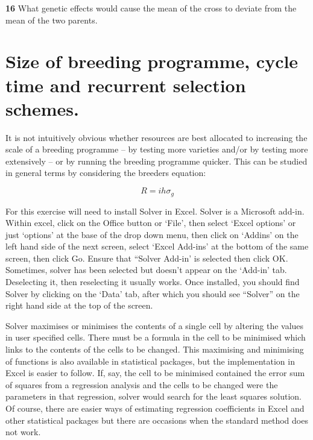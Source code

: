 \documentclass[
]{book}
\makeatletter
\newenvironment{kframe}{%
\medskip{}
\setlength{\fboxsep}{.8em}
 \def\at@end@of@kframe{}%
 \ifinner\ifhmode%
  \def\at@end@of@kframe{\end{minipage}}%
  \begin{minipage}{\columnwidth}%
 \fi\fi%
 \def\FrameCommand##1{\hskip\@totalleftmargin \hskip-\fboxsep
 \colorbox{shadecolor}{##1}\hskip-\fboxsep
     \hskip-\linewidth \hskip-\@totalleftmargin \hskip\columnwidth}%
 \MakeFramed {\advance\hsize-\width
   \@totalleftmargin\z@ \linewidth\hsize
   \@setminipage}}%
 {\par\unskip\endMakeFramed%
 \at@end@of@kframe}
\newenvironment{rmdblock}[1]
  {
  \begin{itemize}
  \renewcommand{\labelitemi}{
    \raisebox{-.7\height}[0pt][0pt]{
      {\setkeys{Gin}{width=3em,keepaspectratio}\texttt{[image: images/\#1]}}
    }
  }
  \setlength{\fboxsep}{1em}
  \begin{kframe}
  \item
  }
  {
  \end{kframe}
  \end{itemize}
  }
\newenvironment{rmdquiz}
  {\begin{rmdblock}{quiz}}
  {\end{rmdblock}}
\makeatother
\begin{document}
\begin{rmdquiz}
\textbf{16}
What genetic effects would cause the mean of the cross to deviate from the mean of the two parents.
\end{rmdquiz}

\hypertarget{size-of-breeding-programme-cycle-time-and-recurrent-selection-schemes.}{%
\section{Size of breeding programme, cycle time and recurrent selection schemes.}\label{size-of-breeding-programme-cycle-time-and-recurrent-selection-schemes.}}

It is not intuitively obvious whether resources are best allocated to increasing the scale of a breeding programme -- by testing more varieties and/or by testing more extensively -- or by running the breeding programme quicker. This can be studied in general terms by considering the breeders equation:

\[R  = ihσ_{g}\]

For this exercise will need to install Solver in Excel. Solver is a Microsoft add-in. Within excel, click on the Office button or `File', then select `Excel options' or just `options' at the base of the drop down menu, then click on `Addins' on the left hand side of the next screen, select `Excel Add-ins' at the bottom of the same screen, then click Go. Ensure that ``Solver Add-in' is selected then click OK. Sometimes, solver has been selected but doesn't appear on the `Add-in' tab. Deselecting it, then reselecting it usually works. Once installed, you should find Solver by clicking on the `Data' tab, after which you should see ``Solver'' on the right hand side at the top of the screen.

Solver maximises or minimises the contents of a single cell by altering the values in user specified cells. There must be a formula in the cell to be minimised which links to the contents of the cells to be changed. This maximising and minimising of functions is also available in statistical packages, but the implementation in Excel is easier to follow. If, say, the cell to be minimised contained the error sum of squares from a regression analysis and the cells to be changed were the parameters in that regression, solver would search for the least squares solution. Of course, there are easier ways of estimating regression coefficients in Excel and other statistical packages but there are occasions when the standard method does not work.
\end{document}
